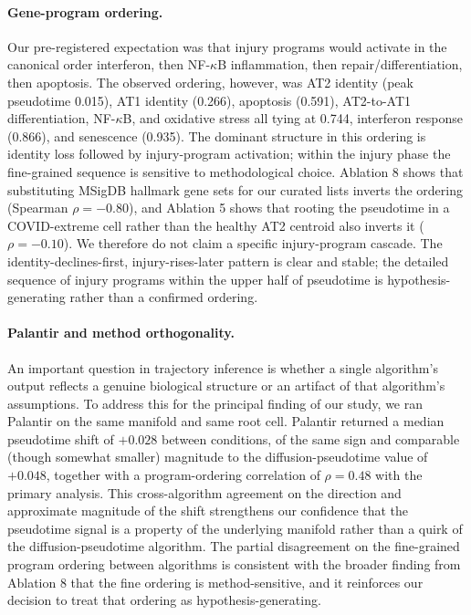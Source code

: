 \documentclass[11pt]{article}
\begin{document}
\paragraph{Gene-program ordering.} Our pre-registered expectation was that injury programs would activate in the canonical order interferon, then NF-$\kappa$B inflammation, then repair/differentiation, then apoptosis. The observed ordering, however, was AT2 identity (peak pseudotime 0.015), AT1 identity (0.266), apoptosis (0.591), AT2-to-AT1 differentiation, NF-$\kappa$B, and oxidative stress all tying at 0.744, interferon response (0.866), and senescence (0.935). The dominant structure in this ordering is identity loss followed by injury-program activation; within the injury phase the fine-grained sequence is sensitive to methodological choice. Ablation 8 shows that substituting MSigDB hallmark gene sets for our curated lists inverts the ordering (Spearman $\rho = -0.80$), and Ablation 5 shows that rooting the pseudotime in a COVID-extreme cell rather than the healthy AT2 centroid also inverts it ($\rho = -0.10$). We therefore do not claim a specific injury-program cascade. The identity-declines-first, injury-rises-later pattern is clear and stable; the detailed sequence of injury programs within the upper half of pseudotime is hypothesis-generating rather than a confirmed ordering.

\paragraph{Palantir and method orthogonality.} An important question in trajectory inference is whether a single algorithm's output reflects a genuine biological structure or an artifact of that algorithm's assumptions. To address this for the principal finding of our study, we ran Palantir \citep{Setty2019} on the same manifold and same root cell. Palantir returned a median pseudotime shift of $+0.028$ between conditions, of the same sign and comparable (though somewhat smaller) magnitude to the diffusion-pseudotime value of $+0.048$, together with a program-ordering correlation of $\rho = 0.48$ with the primary analysis. This cross-algorithm agreement on the direction and approximate magnitude of the shift strengthens our confidence that the pseudotime signal is a property of the underlying manifold rather than a quirk of the diffusion-pseudotime algorithm. The partial disagreement on the fine-grained program ordering between algorithms is consistent with the broader finding from Ablation 8 that the fine ordering is method-sensitive, and it reinforces our decision to treat that ordering as hypothesis-generating.
\end{document}
